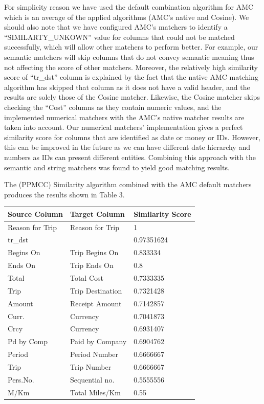 \documentclass{sig-alternate}
\begin{document}
For simplicity reason we have used the default combination algorithm for AMC which is an average of the applied algorithms (AMC's native and Cosine). We should also note that we have configured AMC's matchers to identify a ``SIMILARTY\_UNKOWN'' value for columns that could not be matched successfully, which will allow other matchers to perform better. For example, our semantic matchers will skip columns that do not convey semantic meaning thus not affecting the score of other matchers. Moreover, the relatively high similarity score of ``tr\_dst'' column is explained by the fact that the native AMC matching algorithm has skipped that column as it does not have a valid header, and the results are solely those of the Cosine matcher. Likewise, the Cosine matcher skips checking the ``Cost'' columns as they contain numeric values, and the implemented numerical matchers with the AMC's native matcher results are taken into account. Our numerical matchers' implementation gives a perfect similarity score for columns that are identified as date or money or IDs. However, this can be improved in the future as we can have different date hierarchy and numbers as IDs can present different entities. Combining this approach with the semantic and string matchers was found to yield good matching results.

The (PPMCC) Similarity algorithm combined with the AMC default matchers produces the results shown in Table 3.

\begin{tabular}{|p{0.7in}|p{0.8in}|p{0.8in}|} \hline
\textbf{Source Column} & \textbf{Target Column} & \textbf{Similarity Score} \\ \hline
Reason for Trip & Reason for Trip & 1 \\ \hline
tr\_dst &  & 0.97351624 \\ \hline
Begins On & Trip Begins On & 0.833334 \\ \hline
Ends On & Trip Ends On & 0.8 \\ \hline
Total & Total Cost & 0.7333335 \\ \hline
Trip & Trip Destination & 0.7321428 \\ \hline
Amount & Receipt Amount & 0.7142857 \\ \hline
Curr. & Currency & 0.7041873 \\ \hline
Crcy & Currency & 0.6931407 \\ \hline
Pd by Comp & Paid by Company & 0.6904762 \\ \hline
Period & Period Number & 0.6666667 \\ \hline
Trip & Trip Number & 0.6666667 \\ \hline
Pers.No. & Sequential no. & 0.5555556 \\ \hline
M/Km & Total Miles/Km & 0.55 \\ \hline
\end{tabular}
\end{document}
